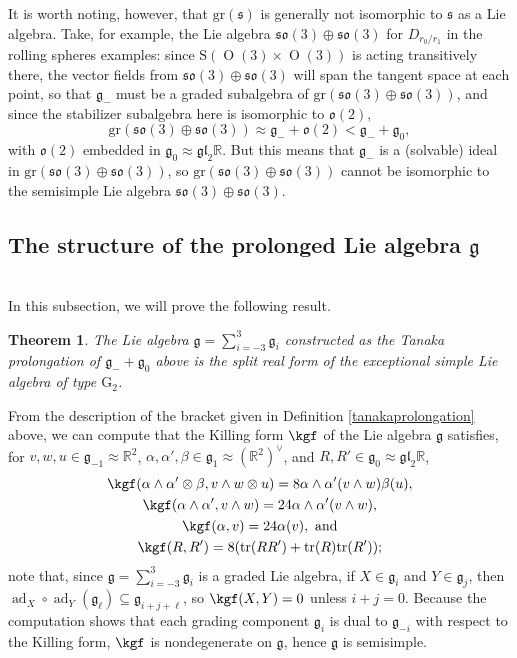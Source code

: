 \documentclass[12pt,a4paper]{amsart}
\newtheorem{theorem}{Theorem}[section]
\theoremstyle{definition}
\DeclareMathOperator{\ad}{ad}
\DeclareMathOperator{\Orth}{O}
\begin{document}
It is worth noting, however, that $\mathrm{gr}(\mathfrak{s})$ is generally not isomorphic to $\mathfrak{s}$ as a Lie algebra. Take, for example, the Lie algebra $\mathfrak{so}(3)\oplus\mathfrak{so}(3)$ for $D_{r_0/r_1}$ in the rolling spheres examples: since $\mathrm{S}(\Orth(3)\times\Orth(3))$ is acting transitively there, the vector fields from $\mathfrak{so}(3)\oplus\mathfrak{so}(3)$ will span the tangent space at each point, so that $\mathfrak{g}_-$ must be a graded subalgebra of $\mathrm{gr}(\mathfrak{so}(3)\oplus\mathfrak{so}(3))$, and since the stabilizer subalgebra here is isomorphic to $\mathfrak{o}(2)$,
\[\mathrm{gr}(\mathfrak{so}(3)\oplus\mathfrak{so}(3))\approx\mathfrak{g}_-+\mathfrak{o}(2)<\mathfrak{g}_-+\mathfrak{g}_0,\]
with $\mathfrak{o}(2)$ embedded in $\mathfrak{g}_0\approx\mathfrak{gl}_2\mathbb{R}$. But this means that $\mathfrak{g}_-$ is a (solvable) ideal in $\mathrm{gr}(\mathfrak{so}(3)\oplus\mathfrak{so}(3))$, so $\mathrm{gr}(\mathfrak{so}(3)\oplus\mathfrak{so}(3))$ cannot be isomorphic to the semisimple Lie algebra $\mathfrak{so}(3)\oplus\mathfrak{so}(3)$.

\vspace{1em}
\subsection{The structure of the prolonged Lie algebra \texorpdfstring{$\mathfrak{g}$}{}}\label{structurestuff}\hfill\\
In this subsection, we will prove the following result.
\begin{theorem}The Lie algebra $\mathfrak{g}=\sum_{i=-3}^3\mathfrak{g}_i$ constructed as the Tanaka prolongation of $\mathfrak{g}_-+\mathfrak{g}_0$ above is the split real form of the exceptional simple Lie algebra of type $\mathrm{G}_2$.\end{theorem}

From the description of the bracket given in Definition \ref{tanakaprolongation} above, we can compute that the Killing form $\kgf$ of the Lie algebra $\mathfrak{g}$ satisfies, for $v,w,u\in\mathfrak{g}_{-1}\approx\mathbb{R}^2$, $\alpha,\alpha',\beta\in\mathfrak{g}_1\approx(\mathbb{R}^2)^\vee$, and $R,R'\in\mathfrak{g}_0\approx\mathfrak{gl}_2\mathbb{R}$,
\begin{gather*}\kgf(\alpha\wedge\alpha'\otimes\beta,v\wedge w\otimes u)=8\alpha\wedge\alpha'(v\wedge w)\beta(u), \\ \kgf(\alpha\wedge\alpha',v\wedge w)=24\alpha\wedge\alpha'(v\wedge w), \\ \kgf(\alpha,v)=24\alpha(v),\text{ and} \\ \kgf(R,R')=8(\mathrm{tr}(RR')+\mathrm{tr}(R)\mathrm{tr}(R'));\end{gather*}
note that, since $\mathfrak{g}=\sum_{i=-3}^3\mathfrak{g}_i$ is a graded Lie algebra, if $X\in\mathfrak{g}_i$ and $Y\in\mathfrak{g}_j$, then $\ad_X\circ\ad_Y(\mathfrak{g}_\ell)\subseteq\mathfrak{g}_{i+j+\ell}$, so $\kgf(X,Y)=0$ unless $i+j=0$. Because the computation shows that each grading component $\mathfrak{g}_i$ is dual to $\mathfrak{g}_{-i}$ with respect to the Killing form, $\kgf$ is nondegenerate on $\mathfrak{g}$, hence $\mathfrak{g}$ is semisimple.
\end{document}
